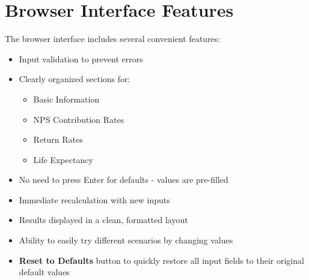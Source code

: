 \documentclass{article}
\begin{document}
\section{Browser Interface Features}
The browser interface includes several convenient features:
\begin{itemize}
    \item Input validation to prevent errors
    \item Clearly organized sections for:
    \begin{itemize}
        \item Basic Information
        \item NPS Contribution Rates
        \item Return Rates
        \item Life Expectancy
    \end{itemize}
    \item No need to press Enter for defaults - values are pre-filled
    \item Immediate recalculation with new inputs
    \item Results displayed in a clean, formatted layout
    \item Ability to easily try different scenarios by changing values
    \item \textbf{Reset to Defaults} button to quickly restore all input fields to their original default values
\end{itemize}
\end{document}
